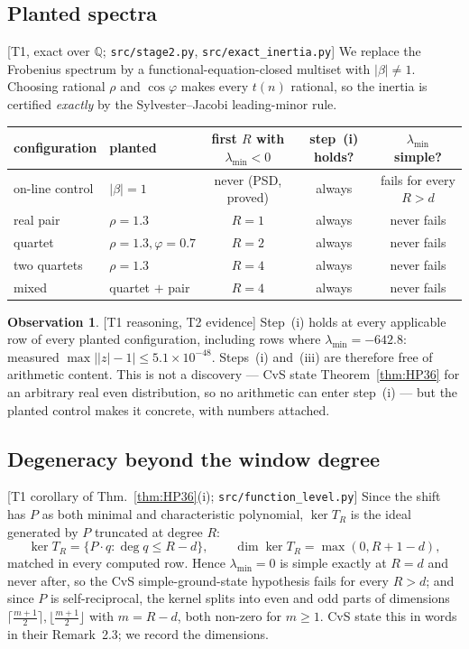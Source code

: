 \documentclass[11pt,a4paper]{article}
\theoremstyle{definition}
\newtheorem{observation}[theorem]{Observation}
\theoremstyle{remark}
\newcommand{\tier}[1]{{\small\textsf{[#1]}}}
\newcommand{\T}{T_R}
\newcommand{\lmin}{\lambda_{\min}}
\newcommand{\src}[1]{{\footnotesize\texttt{#1}}}
\begin{document}
\subsection{Planted spectra}
\tier{T1, exact over $\mathbb{Q}$; \src{src/stage2.py}, \src{src/exact\_inertia.py}}
We replace the Frobenius spectrum by a functional-equation-closed multiset with
$|\beta|\ne1$. Choosing rational $\rho$ and $\cos\varphi$ makes every $t(n)$ rational, so
the inertia is certified \emph{exactly} by the Sylvester--Jacobi leading-minor rule.

\begin{center}
\begin{tabular}{@{}llccc@{}}
\toprule
configuration & planted & first $R$ with $\lmin<0$ & step~(i) holds? & $\lmin$ simple? \\
\midrule
on-line control & $|\beta|=1$ & never (PSD, proved) & always & fails for every $R>d$ \\
real pair & $\rho=1.3$ & $R=1$ & always & never fails \\
quartet & $\rho=1.3,\varphi=0.7$ & $R=2$ & always & never fails \\
two quartets & $\rho=1.3$ & $R=4$ & always & never fails \\
mixed & quartet $+$ pair & $R=4$ & always & never fails \\
\bottomrule
\end{tabular}
\end{center}

\begin{observation}\label{obs:free}\tier{T1 reasoning, T2 evidence}
Step~(i) holds at every applicable row of every planted configuration, including rows where
$\lmin=-642.8$: measured $\max\bigl||z|-1\bigr|\le5.1\times10^{-48}$. Steps~(i) and~(iii)
are therefore free of arithmetic content. This is not a discovery --- CvS state
Theorem~\ref{thm:HP36} for an arbitrary real even distribution, so no arithmetic can enter
step~(i) --- but the planted control makes it concrete, with numbers attached.
\end{observation}

\subsection{Degeneracy beyond the window degree}
\tier{T1 corollary of Thm.~\ref{thm:HP36}(i); \src{src/function\_level.py}}
Since the shift has $P$ as both minimal and characteristic polynomial, $\ker\T$ is the
ideal generated by $P$ truncated at degree $R$:
\begin{equation}
\ker\T=\{P\cdot q:\deg q\le R-d\},\qquad \dim\ker\T=\max(0,R+1-d),
\end{equation}
matched in every computed row. Hence $\lmin=0$ is simple exactly at $R=d$ and never after,
so the CvS simple-ground-state hypothesis fails for every $R>d$; and since $P$ is
self-reciprocal, the kernel splits into even and odd parts of dimensions
$\lceil\frac{m+1}2\rceil,\lfloor\frac{m+1}2\rfloor$ with $m=R-d$, both non-zero for
$m\ge1$. CvS state this in words in their Remark~2.3; we record the dimensions.
\end{document}
